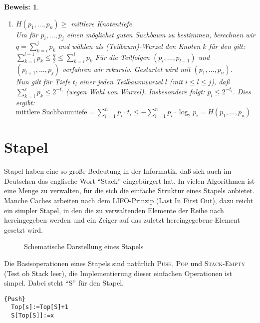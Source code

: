 \documentclass[ngerman,draft,parskip=half*,twoside]{scrreprt}
\theoremstyle{break}
\theoremstyle{nonumberbreak}
\newtheorem{beweis}{Beweis:}
\begin{document}
\begin{beweis}
\begin{enumerate}
    \item $\displaystyle H(p_1,\ldots,p_n)\geq$ mittlere Knotentiefe\\
      Um für $p_i,\ldots,p_j$ einen möglichst guten Suchbaum zu bestimmen, berechnen wir\\ $q=\sum_{k=i}^j p_k$ und wählen
      als (Teilbaum)-Wurzel den Knoten $k$ für den gilt: $\sum_{k=i}^{l-1}p_k\leq\frac{q}{2}\leq\sum_{k=i}^{l}p_k$
      Für die Teilfolgen $(p_i,\ldots,p_{l-1})$ und $(p_{l+1},\ldots,p_j)$ verfahren wir rekursiv. Gestartet wird mit $(p_1,\ldots,p_n)$.\\
      Nun gilt für Tiefe $t_l$ einer jeden Teilbaumwurzel $l$ (mit $i\leq l\leq j$), daß $\sum_{k=i}^j p_k \leq 2^{-t_l}$
      (wegen Wahl von Wurzel). Insbesondere folgt: $p_l\leq2^{-t_l}$. Dies ergibt:
      $\mbox{mittlere Suchbaumtiefe}=\sum_{i=1}^n p_i\cdot t_i\leq-\sum_{i=1}^n p_i\cdot \log_2p_i=H(p_1,\ldots,p_n)$
\end{enumerate}
\end{beweis}

\section{Stapel}
Stapel haben eine so große Bedeutung in der Informatik, daß sich auch
im Deutschen das englische Wort "`Stack"' eingebürgert hat.
In vielen Algorithmen ist eine Menge zu verwalten, für die sich die einfache Struktur eines Stapels anbietet.
Manche Caches arbeiten nach dem LIFO-Prinzip (Last In First Out), dazu reicht ein simpler Stapel, in den die zu verwaltenden Elemente
der Reihe nach hereingegeben werden und ein Zeiger auf das zuletzt hereingegebene Element gesetzt wird.

\begin{figure}[H]
  \centering
  \caption{Schematische Darstellung eines Stapels}
  \label{031203a}
\end{figure}

Die Basisoperationen eines Stapels sind natürlich \textsc{Push}, \textsc{Pop} und \textsc{Stack-Empty} (Test ob Stack leer), die Implementierung dieser einfachen
Operationen ist simpel. Dabei steht "`S"' für den Stapel.

\begin{Algorithmus}[H]
\begin{lstlisting}[frame=tlrb, mathescape=true, title=\textsc{Push}, gobble=1]{Push}
  Top[s]:=Top[S]+1
  S[Top[S]]:=x
\end{lstlisting}
\end{Algorithmus}
\end{document}
